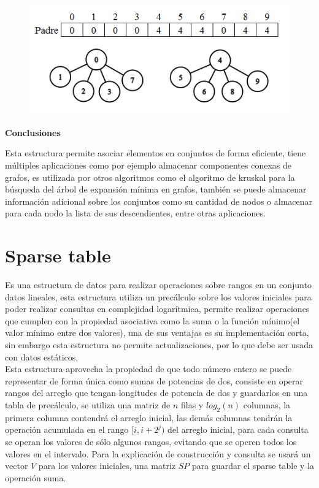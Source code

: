 \documentclass[12pt, a4paper]{article}
\newcommand\cppfile[2][]{

}
\newcommand{\subtitulo}[1]{\begin{center}\textbf{#1}\end{center}}
\begin{document}
	\begin{figure}[!htb]
			\centering
			\includegraphics[scale=0.6]{Estructuras_de_datos/imagenes/disjoint_set/compresion}
			\caption{}
			\label{estructuras:disjoint_set:compresion}
		\endminipage
			\cppfile[16-21]{Estructuras_de_datos/codigos/union_find_compresion.cpp}
		\endminipage
	\end{figure}
	
	\subtitulo{Conclusiones}
	Esta estructura permite asociar elementos en conjuntos de forma eficiente, tiene múltiples aplicaciones como
	por ejemplo almacenar componentes conexas de grafos, es utilizada por otros algoritmos como el algoritmo de 
	kruskal para la búsqueda del árbol de expansión mínima en grafos, también se puede almacenar información
	adicional sobre los conjuntos como su cantidad de nodos o almacenar para cada nodo la lista de sus descendientes,
	entre otras aplicaciones.
	
	\section{Sparse table}
	
	Es una estructura de datos para realizar operaciones sobre rangos en un conjunto datos lineales, esta 
	estructura utiliza un precálculo sobre los valores iniciales para poder realizar consultas en complejidad 
	logarítmica, permite realizar operaciones que cumplen con la propiedad asociativa como la suma o la función 
	mínimo(el valor mínimo entre dos valores), una de sus ventajas es su implementación corta, sin embargo esta 
	estructura no permite actualizaciones, por lo que debe ser usada con datos estáticos.\\
	
	Esta estructura aprovecha la propiedad de que todo número entero se puede representar de forma única como 
	sumas de potencias de dos, consiste en operar rangos del arreglo que tengan longitudes de potencia de dos y 
	guardarlos en una tabla de precálculo, se utiliza una matriz de $n$ filas y $log_{2}(n)$ columnas, la primera 
	columna contendrá el arreglo inicial, las demás columnas tendrán la operación acumulada en el rango 
	$[i, i+2^{j})$ del arreglo inicial, para cada consulta se operan los valores de sólo algunos rangos, evitando que 
	se operen todos los valores en el intervalo. Para la explicación de construcción y consulta se usará un vector 
	$V$ para los valores iniciales, una matriz $SP$ para guardar el sparse table y la operación suma.\\
	
\end{document}
